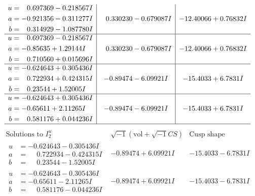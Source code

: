 \documentclass[1p]{elsarticle_modified}
\theoremstyle{definition}
\newcommand{\I}{\sqrt{-1}}
\begin{document}
$$\begin{array}{c|c|c}
\begin{aligned}
u &= \phantom{-}0.697369 - 0.218567 I \\
a &= -0.921356 - 0.311277 I \\
b &= \phantom{-}0.314929 - 1.087780 I\end{aligned}
 & \phantom{-}0.330230 - 0.679087 I & -12.40066 + 0.76832 I \\ \hline\begin{aligned}
u &= \phantom{-}0.697369 - 0.218567 I \\
a &= -0.85635 + 1.29144 I \\
b &= \phantom{-}0.710560 + 0.015696 I\end{aligned}
 & \phantom{-}0.330230 - 0.679087 I & -12.40066 + 0.76832 I \\ \hline\begin{aligned}
u &= -0.624643 + 0.305436 I \\
a &= \phantom{-}0.722934 + 0.424315 I \\
b &= \phantom{-}0.23544 + 1.52005 I\end{aligned}
 & -0.89474 - 6.09921 I & -15.4033 + 6.7831 I \\ \hline\begin{aligned}
u &= -0.624643 + 0.305436 I \\
a &= -0.65611 + 2.11265 I \\
b &= \phantom{-}0.581176 + 0.044236 I\end{aligned}
 & -0.89474 - 6.09921 I & -15.4033 + 6.7831 I\\
 \hline 
 \end{array}$$\newpage$$\begin{array}{c|c|c}  
\text{Solutions to }I^u_{2}& \I (\text{vol} + \sqrt{-1}CS) & \text{Cusp shape}\\
 \hline 
\begin{aligned}
u &= -0.624643 - 0.305436 I \\
a &= \phantom{-}0.722934 - 0.424315 I \\
b &= \phantom{-}0.23544 - 1.52005 I\end{aligned}
 & -0.89474 + 6.09921 I & -15.4033 - 6.7831 I \\ \hline\begin{aligned}
u &= -0.624643 - 0.305436 I \\
a &= -0.65611 - 2.11265 I \\
b &= \phantom{-}0.581176 - 0.044236 I\end{aligned}
 & -0.89474 + 6.09921 I & -15.4033 - 6.7831 I \\ \hline\begin{aligned}

\end{aligned}
\end{array}$$
\end{document}
